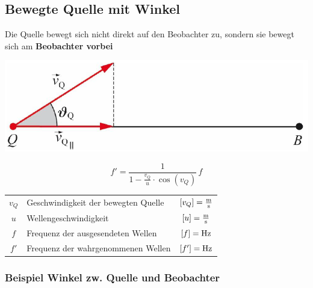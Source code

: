\subsection{Bewegte Quelle mit Winkel}\label{bewegte-Quelle-mit-Winkel}
Die Quelle bewegt sich nicht direkt auf den Beobachter zu, sondern sie bewegt sich am \textbf{Beobachter vorbei} \\


\begin{minipage}{0.48\linewidth}
\includegraphics[width=0.98\linewidth]{Bilder/Wellen-Optik/bewegte_quelle_winkel} \\
\end{minipage}
\hfill
\begin{minipage}{0.48\linewidth}
$$ \boxed{ f' =  \frac{1}{1 - \frac{v_Q}{u} \cdot \cos(v_Q)}  \, f} $$
\end{minipage}



\begin{tabular}{clc}
$v_Q$ & Geschwindigkeit der bewegten Quelle & $[v_Q] = \frac{\mathrm{m}}{\mathrm{s}}$ \\
$u$ & Wellengeschwindigkeit & $[u] = \frac{\mathrm{m}}{\mathrm{s}}$ \\
$f$ & Frequenz der ausgesendeten Wellen & $[f] = \mathrm{Hz}$ \\
$f'$ & Frequenz der wahrgenommenen Wellen & $[f'] = \mathrm{Hz}$ \\
\end{tabular}



\subsubsection{Beispiel Winkel zw. Quelle und Beobachter}

